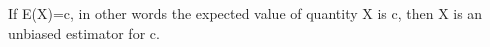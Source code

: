 If E(X)=c, in other words the expected value of quantity X is c,
then X is an unbiased estimator for c.